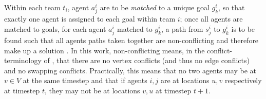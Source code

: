 \documentclass[english]{article}
\begin{document}
	Within each team $t_i$, agent $a_j^i$ are to be \textit{matched} to a unique goal $g_k^i$, so that exactly one agent is assigned to each goal within team $i$; once all agents are matched to goals, for each agent $a_j^i$ matched to $g_k^i$, a path from $s_j^i$ to $g_k^i$ is to be found such that all agents paths taken together are non-conflicting and therefore make up a solution \cite{ma2016}. In this work, non-conflicting means, in the conflict-terminology of \cite{stern2019}, that there are no vertex conflicts (and thus no edge conflicts) and no swapping conflicts. Practically, this means that no two agents may be at $v\in V$ at the same timestep and that if agents $i,j$ are at locations $u,v$ respectively at timestep $t$, they may not be at locations $v,u$ at timestep $t+1$. 
	\printbibliography
	
\end{document}
